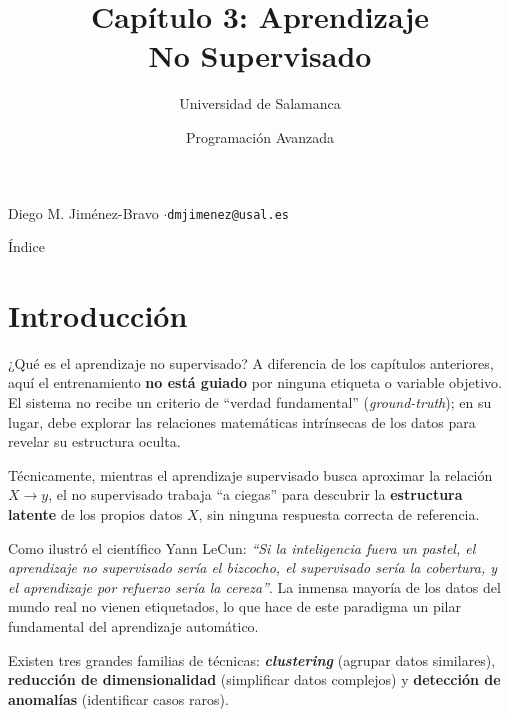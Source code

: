 \documentclass[aspectratio=169]{beamer}
\title[3. Aprendizaje No Supervisado]{Capítulo 3: Aprendizaje\\No Supervisado}
\author{Universidad de Salamanca}
\institute{Facultad de Ciencias}
\date{Programación Avanzada}
\makeatletter
\newcommand{\titleslide}{%
\begin{frame}
  \titlepage
  \vspace{-0.5em}
  {\footnotesize Diego M. Jiménez-Bravo \quad$\cdot$\quad \texttt{dmjimenez@usal.es}}
\end{frame}
}
\makeatother
\begin{document}
\titleslide

\begin{frame}{Índice}
  \tableofcontents
\end{frame}

\section{Introducción}

\begin{frame}{¿Qué es el aprendizaje no supervisado?}
  \small
  A diferencia de los capítulos anteriores, aquí el entrenamiento \textbf{no está guiado} por ninguna etiqueta o variable objetivo. El sistema no recibe un criterio de ``verdad fundamental'' (\textit{ground-truth}); en su lugar, debe explorar las relaciones matemáticas intrínsecas de los datos para revelar su estructura oculta.

  Técnicamente, mientras el aprendizaje supervisado busca aproximar la relación $X \rightarrow y$, el no supervisado trabaja ``a ciegas'' para descubrir la \textbf{estructura latente} de los propios datos $X$, sin ninguna respuesta correcta de referencia.

  Como ilustró el científico Yann LeCun: \textit{``Si la inteligencia fuera un pastel, el aprendizaje no supervisado sería el bizcocho, el supervisado sería la cobertura, y el aprendizaje por refuerzo sería la cereza''}. La inmensa mayoría de los datos del mundo real no vienen etiquetados, lo que hace de este paradigma un pilar fundamental del aprendizaje automático.

  Existen tres grandes familias de técnicas: \textbf{\textit{clustering}} (agrupar datos similares), \textbf{reducción de dimensionalidad} (simplificar datos complejos) y \textbf{detección de anomalías} (identificar casos raros).
\end{frame}
\end{document}
